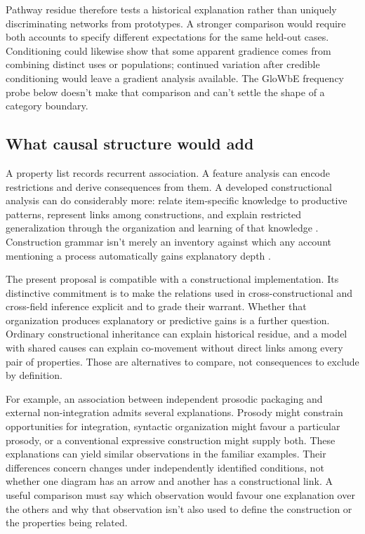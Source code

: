 \documentclass[12pt]{article}
\begin{document}
Pathway residue therefore tests a historical explanation rather than uniquely discriminating networks from prototypes. A stronger comparison would require both accounts to specify different expectations for the same held-out cases. Conditioning could likewise show that some apparent gradience comes from combining distinct uses or populations; continued variation after credible conditioning would leave a gradient analysis available. The GloWbE frequency probe below doesn't make that comparison and can't settle the shape of a category boundary.

\subsection{What causal structure would add}

A property list records recurrent association. A feature analysis can encode restrictions and derive consequences from them. A developed constructional analysis can do considerably more: relate item-specific knowledge to productive patterns, represent links among constructions, and explain restricted generalization through the organization and learning of that knowledge \citep[Ch.~6]{goldberg2006}. Construction grammar isn't merely an inventory against which any account mentioning a process automatically gains explanatory depth \citep[cf.][]{goldberg1995constructions,croft2001}.

The present proposal is compatible with a constructional implementation. Its distinctive commitment is to make the relations used in cross-constructional and cross-field inference explicit and to grade their warrant. Whether that organization produces explanatory or predictive gains is a further question. Ordinary constructional inheritance can explain historical residue, and a model with shared causes can explain co-movement without direct links among every pair of properties. Those are alternatives to compare, not consequences to exclude by definition.

For example, an association between independent prosodic packaging and external non-integration admits several explanations. Prosody might constrain opportunities for integration, syntactic organization might favour a particular prosody, or a conventional expressive construction might supply both. These explanations can yield similar observations in the familiar examples. Their differences concern changes under independently identified conditions, not whether one diagram has an arrow and another has a constructional link. A useful comparison must say which observation would favour one explanation over the others and why that observation isn't also used to define the construction or the properties being related.
\end{document}
